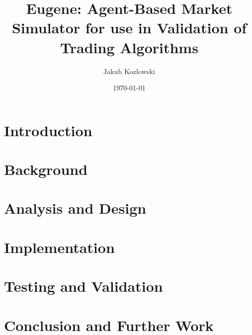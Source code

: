 \documentclass{report}
\title{Eugene: Agent-Based Market Simulator for use in Validation of Trading Algorithms}
\author{Jakub Koz\l owski}
\date{\today}
\begin{document}
\maketitle

\tableofcontents

\pagestyle{fancy}

\chapter{Introduction}
\label{introduction}


\chapter{Background}
\label{background}

\chapter{Analysis and Design}
\label{analysis-and-design}




\chapter{Implementation}
\label{implementation}

\chapter{Testing and Validation}
\label{testing}

\chapter{Conclusion and Further Work}
\label{conclusion}
\end{document}
